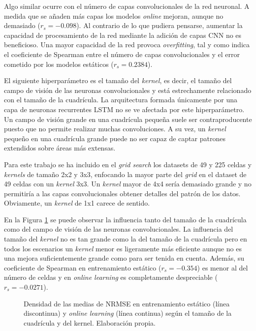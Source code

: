 Algo similar ocurre con el número de capas convolucionales de la red neuronal. A medida que se añaden más capas los modelos \textit{online} mejoran, aunque no demasiado ($r_s=-0.098$). Al contrario de lo que pudiera pensarse, aumentar la capacidad de procesamiento de la red mediante la adición de capas CNN no es beneficioso. Una mayor capacidad de la red provoca \textit{overfitting}, tal y como indica el coeficiente de Spearman entre el número de capas convolucionales y el error cometido por los modelos estáticos ($r_s=0.2384$).




El siguiente hiperparámetro es el tamaño del \textit{kernel}, es decir, el tamaño del campo de visión de las neuronas convolucionales y está estrechamente relacionado con el tamaño de la cuadrícula. La arquitectura formada únicamente por una capa de neuronas recurrentes LSTM no se ve afectada por este hiperparámetro. Un campo de visión grande en una cuadrícula pequeña suele ser contraproducente puesto que no permite realizar muchas convoluciones. A su vez, un \textit{kernel} pequeño en una cuadrícula grande puede no ser capaz de captar patrones extendidos sobre áreas más extensas.

Para este trabajo se ha incluido en el \textit{grid search} los datasets de 49 y 225 celdas y \textit{kernels} de tamaño 2x2 y 3x3, enfocando la mayor parte del \textit{grid} en el dataset de 49 celdas con un \textit{kernel} 3x3. Un \textit{kernel} mayor de 4x4 sería demasiado grande y no permitiría a las capas convolucionales obtener detalles del patrón de los datos. Obviamente, un \textit{kernel} de 1x1 carece de sentido.

En la Figura \ref{fig:kernel_metros2} se puede observar la influencia tanto del tamaño de la cuadrícula como del campo de visión de las neuronas convolucionales. La influencia del tamaño del \textit{kernel} no es tan grande como la del tamaño de la cuadrícula pero en todos los escenarios un \textit{kernel} menor es ligeramente más eficiente aunque no es una mejora suficientemente grande como para ser tenida en cuenta. Además, su coeficiente de Spearman en entrenamiento estático ($r_s=-0.354$) es menor al del número de celdas y en \textit{online learning} es completamente despreciable ($r_s=-0.0271$).

\begin{figure}[h!]
	\centering
	
	\caption{Densidad de las medias de NRMSE en entrenamiento estático (línea discontinua) y \textit{online learning} (línea continua) según el tamaño de la cuadrícula y del kernel. Elaboración propia.}
	\label{fig:kernel_metros2}
\end{figure}
\FloatBarrier

